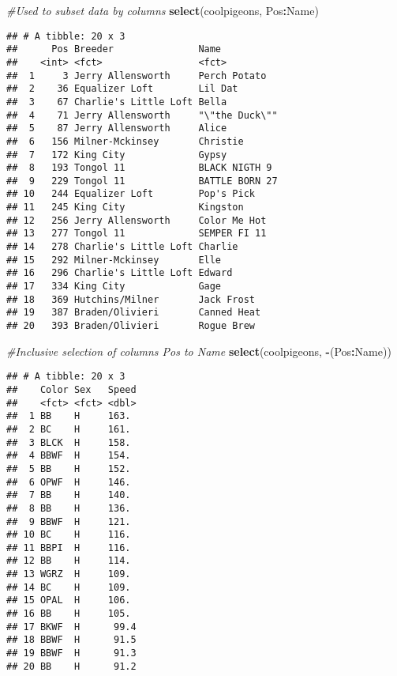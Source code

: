 \documentclass[]{article}
\newenvironment{Shaded}{\begin{snugshade}}{\end{snugshade}}
\newcommand{\KeywordTok}[1]{\textcolor[rgb]{0.13,0.29,0.53}{\textbf{#1}}}
\newcommand{\CommentTok}[1]{\textcolor[rgb]{0.56,0.35,0.01}{\textit{#1}}}
\newcommand{\OperatorTok}[1]{\textcolor[rgb]{0.81,0.36,0.00}{\textbf{#1}}}
\newcommand{\NormalTok}[1]{#1}
\begin{document}
\begin{Shaded}
\begin{Highlighting}[]
\CommentTok{#Used to subset data by columns}
\KeywordTok{select}\NormalTok{(coolpigeons, Pos}\OperatorTok{:}\NormalTok{Name)}
\end{Highlighting}
\end{Shaded}

\begin{verbatim}
## # A tibble: 20 x 3
##      Pos Breeder               Name          
##    <int> <fct>                 <fct>         
##  1     3 Jerry Allensworth     Perch Potato  
##  2    36 Equalizer Loft        Lil Dat       
##  3    67 Charlie's Little Loft Bella         
##  4    71 Jerry Allensworth     "\"the Duck\""
##  5    87 Jerry Allensworth     Alice         
##  6   156 Milner-Mckinsey       Christie      
##  7   172 King City             Gypsy         
##  8   193 Tongol 11             BLACK NIGTH 9 
##  9   229 Tongol 11             BATTLE BORN 27
## 10   244 Equalizer Loft        Pop's Pick    
## 11   245 King City             Kingston      
## 12   256 Jerry Allensworth     Color Me Hot  
## 13   277 Tongol 11             SEMPER FI 11  
## 14   278 Charlie's Little Loft Charlie       
## 15   292 Milner-Mckinsey       Elle          
## 16   296 Charlie's Little Loft Edward        
## 17   334 King City             Gage          
## 18   369 Hutchins/Milner       Jack Frost    
## 19   387 Braden/Olivieri       Canned Heat   
## 20   393 Braden/Olivieri       Rogue Brew
\end{verbatim}

\begin{Shaded}
\begin{Highlighting}[]
\CommentTok{#Inclusive selection of columns Pos to Name}
\KeywordTok{select}\NormalTok{(coolpigeons, }\OperatorTok{-}\NormalTok{(Pos}\OperatorTok{:}\NormalTok{Name))}
\end{Highlighting}
\end{Shaded}

\begin{verbatim}
## # A tibble: 20 x 3
##    Color Sex   Speed
##    <fct> <fct> <dbl>
##  1 BB    H     163. 
##  2 BC    H     161. 
##  3 BLCK  H     158. 
##  4 BBWF  H     154. 
##  5 BB    H     152. 
##  6 OPWF  H     146. 
##  7 BB    H     140. 
##  8 BB    H     136. 
##  9 BBWF  H     121. 
## 10 BC    H     116. 
## 11 BBPI  H     116. 
## 12 BB    H     114. 
## 13 WGRZ  H     109. 
## 14 BC    H     109. 
## 15 OPAL  H     106. 
## 16 BB    H     105. 
## 17 BKWF  H      99.4
## 18 BBWF  H      91.5
## 19 BBWF  H      91.3
## 20 BB    H      91.2
\end{verbatim}
\end{document}
